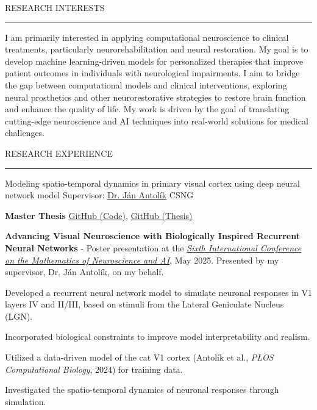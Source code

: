 \documentclass{resume} %
\renewenvironment{rSection}[1]{
\sectionskip
\textcolor{CarnegieMellonRed}{\MakeUppercase{#1}}
\sectionlineskip
\hrule
\begin{list}{}{
\setlength{\leftmargin}{1.5em}
}
\item[]
}{
\end{list}
}
\begin{document}
\begin{rSection}{Research Interests}
    I am primarily interested in applying computational neuroscience to clinical treatments, 
    particularly neurorehabilitation and neural restoration. My goal is to develop machine 
    learning-driven models for personalized therapies that improve patient outcomes in 
    individuals with neurological impairments. I aim to bridge the gap between computational 
    models and clinical interventions, exploring neural prosthetics and other neurorestorative 
    strategies to restore brain function and enhance the quality of life.
    My work is driven by the goal of translating cutting-edge neuroscience and 
    AI techniques into real-world solutions for medical challenges.
\end{rSection}


\begin{rSection}{Research Experience}
\begin{rProject}{\large Modeling spatio-temporal dynamics in primary visual cortex 
using deep neural network model}{}
{Supervisor: \href{https://www.mff.cuni.cz/en/faculty/organizational-structure/people?hdl=11457}
{Dr. Ján Antolík}}
{CSNG}
    \item \textbf{Master Thesis} \vline \: 
    \href{https://github.com/dbeinhauer/mcs-source}{GitHub (Code)},
    \href{https://github.com/dbeinhauer/mcs-thesis}{GitHub (Thesis)}
    \item \textbf{Advancing Visual Neuroscience with Biologically Inspired Recurrent Neural Networks} - Poster presentation at the  \href{https://www.neuromonster.org/poster-session-1}{\emph{Sixth International Conference on the Mathematics of Neuroscience and AI}}, May 2025. Presented by my supervisor, Dr. Ján Antolík, on my behalf.
    \item Developed a recurrent neural network model to simulate neuronal responses in V1 layers IV and II/III, based on stimuli from the Lateral Geniculate Nucleus (LGN).
    \item Incorporated biological constraints to improve model interpretability and realism.
    \item Utilized a data-driven model of the cat V1 cortex (Antolík et al., \emph{PLOS Computational Biology}, 2024) for training data.
    \item Investigated the spatio-temporal dynamics of neuronal responses through simulation.
\end{rProject}



\end{rSection}
\end{document}
